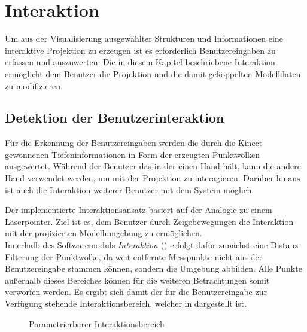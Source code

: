 \chapter{Interaktion}
\label{chap.interaction}
Um aus der Visualisierung ausgewählter Strukturen und Informationen eine interaktive Projektion zu erzeugen ist es erforderlich Benutzereingaben zu erfassen und auszuwerten. Die in diesem Kapitel beschriebene Interaktion ermöglicht dem Benutzer die Projektion und die damit gekoppelten Modelldaten zu modifizieren.

\section{Detektion der Benutzerinteraktion}
Für die Erkennung der Benutzereingaben werden die durch die Kinect gewonnenen Tiefeninformationen in Form der erzeugten Punktwolken ausgewertet. Während der Benutzer das \kps{} in der einen Hand hält, kann die andere Hand verwendet werden, um mit der Projektion zu interagieren. Darüber hinaus ist auch die Interaktion weiterer Benutzer mit dem System möglich.\\
\prever{
}

Der implementierte Interaktionsansatz basiert auf der Analogie zu einem Laserpointer. Ziel ist es, dem Benutzer durch Zeigebewegungen die Interaktion mit der projizierten Modellumgebung zu ermöglichen.\\
Innerhalb des Softwaremoduls \textit{Interaktion} () erfolgt dafür zunächst eine Distanz-Filterung der Punktwolke, da weit entfernte Messpunkte nicht aus der Benutzereingabe stammen können, sondern die Umgebung abbilden. Alle Punkte außerhalb dieses Bereiches können für die weiteren Betrachtungen somit verworfen werden. Es ergibt sich damit der für die Benutzereingabe zur Verfügung stehende Interaktionsbereich, welcher in  dargestellt ist.\\

\begin{figure}[!ht]
	\begin{center}
		\caption{Parametrierbarer Interaktionsbereich}
		\label{fig.intfov}
	\end{center}
\end{figure}


